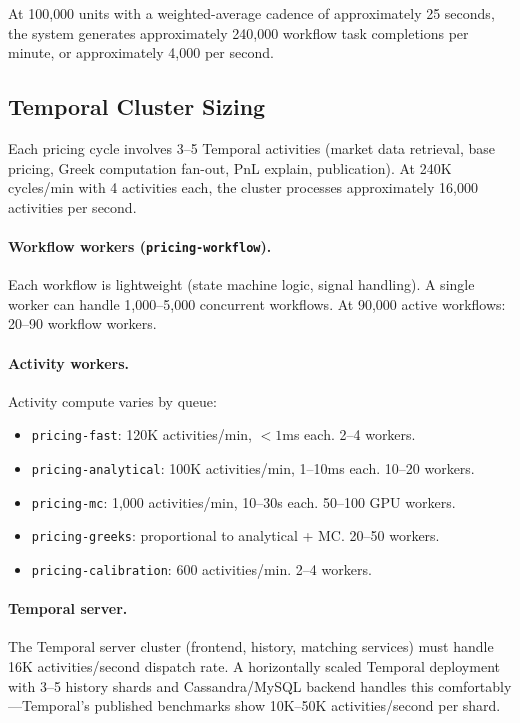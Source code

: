 \documentclass[11pt,a4paper]{article}
\begin{document}
At 100{,}000 units with a weighted-average cadence of approximately 25 seconds, the system generates approximately 240{,}000 workflow task completions per minute, or approximately 4{,}000 per second.

\subsection{Temporal Cluster Sizing}

Each pricing cycle involves 3--5 Temporal activities (market data retrieval, base pricing, Greek computation fan-out, PnL explain, publication).  At 240K cycles/min with 4 activities each, the cluster processes approximately 16{,}000 activities per second.

\paragraph{Workflow workers (\texttt{pricing-workflow}).}  Each workflow is lightweight (state machine logic, signal handling).  A single worker can handle 1{,}000--5{,}000 concurrent workflows.  At 90{,}000 active workflows: 20--90 workflow workers.

\paragraph{Activity workers.}  Activity compute varies by queue:
\begin{itemize}[nosep]
\item \texttt{pricing-fast}: 120K activities/min, $<1$ms each.  2--4 workers.
\item \texttt{pricing-analytical}: 100K activities/min, 1--10ms each.  10--20 workers.
\item \texttt{pricing-mc}: 1{,}000 activities/min, 10--30s each.  50--100 GPU workers.
\item \texttt{pricing-greeks}: proportional to analytical + MC.  20--50 workers.
\item \texttt{pricing-calibration}: 600 activities/min.  2--4 workers.
\end{itemize}

\paragraph{Temporal server.}  The Temporal server cluster (frontend, history, matching services) must handle 16K activities/second dispatch rate.  A horizontally scaled Temporal deployment with 3--5 history shards and Cassandra/MySQL backend handles this comfortably---Temporal's published benchmarks show 10K--50K activities/second per shard.
\end{document}
